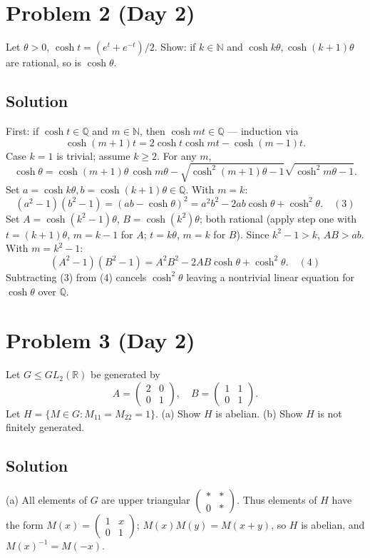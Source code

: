 \documentclass{article}
\begin{document}
\section*{Problem 2 (Day 2)}
Let $\theta > 0$, $\cosh t = (e^t + e^{-t})/2$. Show: if $k \in \mathbb{N}$ and $\cosh k\theta, \cosh(k+1)\theta$ are rational, so is $\cosh\theta$.

\subsection*{Solution}
First: if $\cosh t \in \mathbb{Q}$ and $m \in \mathbb{N}$, then $\cosh mt \in \mathbb{Q}$ — induction via
\[
\cosh(m+1)t = 2\cosh t \cosh mt - \cosh(m-1)t.
\]
Case $k=1$ is trivial; assume $k \geq 2$. For any $m$,
\[
\cosh\theta = \cosh(m+1)\theta\,\cosh m\theta - \sqrt{\cosh^2(m+1)\theta - 1}\sqrt{\cosh^2 m\theta - 1}.
\]
Set $a = \cosh k\theta, b = \cosh(k+1)\theta \in \mathbb{Q}$. With $m = k$:
\[
(a^2-1)(b^2-1) = (ab - \cosh\theta)^2 = a^2 b^2 - 2ab\cosh\theta + \cosh^2\theta. \quad (3)
\]
Set $A = \cosh(k^2-1)\theta$, $B = \cosh(k^2)\theta$; both rational (apply step one with $t=(k+1)\theta$, $m=k-1$ for $A$; $t=k\theta$, $m=k$ for $B$). Since $k^2 - 1 > k$, $AB > ab$. With $m = k^2 - 1$:
\[
(A^2-1)(B^2-1) = A^2 B^2 - 2AB\cosh\theta + \cosh^2\theta. \quad (4)
\]
Subtracting (3) from (4) cancels $\cosh^2\theta$ leaving a nontrivial linear equation for $\cosh\theta$ over $\mathbb{Q}$.

\section*{Problem 3 (Day 2)}
Let $G \leq GL_2(\mathbb{R})$ be generated by
\[
A = \begin{pmatrix}2 & 0\\0 & 1\end{pmatrix}, \quad B = \begin{pmatrix}1 & 1\\0 & 1\end{pmatrix}.
\]
Let $H = \{M \in G : M_{11} = M_{22} = 1\}$.
(a) Show $H$ is abelian.
(b) Show $H$ is not finitely generated.

\subsection*{Solution}
(a) All elements of $G$ are upper triangular $\begin{pmatrix}*&*\\0&*\end{pmatrix}$. Thus elements of $H$ have the form $M(x) = \begin{pmatrix}1 & x\\ 0 & 1\end{pmatrix}$; $M(x)M(y) = M(x+y)$, so $H$ is abelian, and $M(x)^{-1} = M(-x)$.
\end{document}
